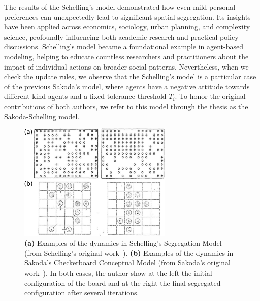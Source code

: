 The results of the Schelling's model demonstrated how even mild personal preferences can unexpectedly lead to significant spatial segregation. Its insights have been applied across economics, sociology, urban planning, and complexity science, profoundly influencing both academic research and practical policy discussions. Schelling's model became a foundational example in agent-based modeling, helping to educate countless researchers and practitioners about the impact of individual actions on broader social patterns. Nevertheless, when we check the update rules, we observe that the Schelling's model is a particular case of the previous Sakoda's model, where agents have a negative attitude towards different-kind agents and a fixed tolerance threshold $T_i$. To honor the original contributions of both authors, we refer to this model through the thesis as the Sakoda-Schelling model.

\begin{figure}
    \centering
    \captionsetup{font=sf}
    \includegraphics[width=0.65\textwidth]{Figs/Introduction/schelling_diagrams.pdf}
    \caption[Schelling and Sakoda checkerboard examples]{\textbf{(a)} Examples of the dynamics in Schelling's Segregation Model (from Schelling's original work~\cite{Schelling}). \textbf{(b)} Examples of the dynamics in Sakoda’s Checkerboard Conceptual Model (from Sakoda's original work~\cite{sakoda1949minidoka}). In both cases, the author show at the left the initial configuration of the board and at the right the final segregated configuration after several iterations.}
    \label{fig:Schelling_fig}
\end{figure}

